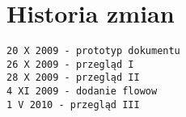 \documentclass[12pt,a4paper,twoside]{article}
\begin{document}







\section{Historia zmian}

\begin{verbatim}
20 X 2009 - prototyp dokumentu
26 X 2009 - przegląd I
28 X 2009 - przegląd II
4 XI 2009 - dodanie flowow
1 V 2010 - przegląd III
\end{verbatim}
\end{document}
